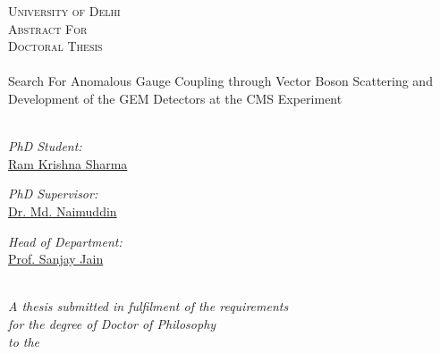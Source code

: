 \begin{titlepage}
\begin{center}

\textsc{\LARGE \color{red!50!black}University of Delhi}\\[1.0cm] %
\textsc{\Large Abstract For}\\ %
\textsc{\Large Doctoral Thesis}\\ %

\HRule \\[0.2cm] %
{\huge {}\selectfont Search For Anomalous Gauge Coupling through Vector Boson Scattering and Development of the GEM Detectors at the CMS Experiment}\\ %
\HRule \\[0.4cm] %
%
\begin{center}
\emph{PhD Student:}\\
\href{https://ram1123.github.io/about/}{\color{red!50!black}Ram Krishna Sharma} %
\end{center}
\vfill
\begin{minipage}{0.4\textwidth}
\begin{flushleft} \large
\emph{PhD Supervisor:} \\
\href{http://www.du.ac.in/du/uploads/Faculty%20Profiles/2017/Physics/Dec2016_Physics_Naimuddin.pdf}{\color{red!50!black}Dr. Md. Naimuddin} %
\end{flushleft}
\end{minipage}
\begin{minipage}{0.4\textwidth}
\begin{flushright} \large
\emph{Head of Department:} \\
\href{http://www.du.ac.in/du/uploads/Faculty%20Profiles/2017/Physics/Dec2016_Physics_Naimuddin.pdf}{\color{red!50!black}Prof. Sanjay Jain} %
\end{flushright}
\end{minipage}\\[1.0cm]
 
\large \textit{A thesis submitted in fulfilment of the requirements\\ for the degree of Doctor of Philosophy}\\ %
\textit{to the}\\


\end{center}
\end{titlepage}
